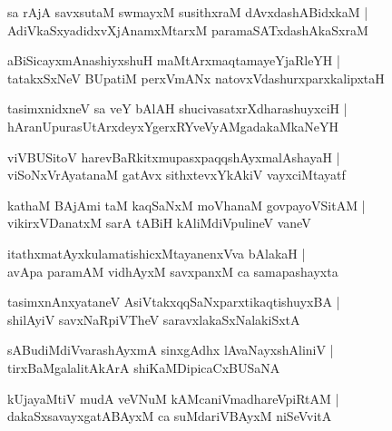 \documentclass[twoside,12pt,openright]{book}
\newcounter{shloka}[chapter]
\begin{document}
\begin{shloka}%
sa rAjA savxsutaM swmayxM susithxraM dAvxdashABidxkaM |\\
AdiVkaSxyadidxvXjAnamxMtarxM paramaSATxdashAkaSxraM 
\end{shloka}

\begin{shloka}%
aBiSicayxmAnashiyxshuH maMtArxmaqtamayeYjaRleYH |\\
tatakxSxNeV BUpatiM perxVmANx natovxVdashurxparxkalipxtaH 
\end{shloka}

\begin{shloka}%
tasimxnidxneV sa veY bAlAH shucivasatxrXdharashuyxciH |\\
hAranUpurasUtArxdeyxYgerxRYveVyAMgadakaMkaNeYH 
\end{shloka}

\begin{shloka}%
viVBUSitoV harevBaRkitxmupasxpaqqshAyxmalAshayaH |\\
viSoNxVrAyatanaM gatAvx sithxtevxYkAkiV vayxciMtayatf
\end{shloka}

\begin{shloka}%
kathaM BAjAmi taM kaqSaNxM moVhanaM govpayoVSitAM |\\
vikirxVDanatxM sarA tABiH kAliMdiVpulineV vaneV 
\end{shloka}

\begin{shloka}%
itathxmatAyxkulamatishicxMtayanenxVva bAlakaH |\\
avApa paramAM vidhAyxM savxpanxM ca samapashayxta
\end{shloka}

\begin{shloka}%
tasimxnAnxyataneV AsiVtakxqqSaNxparxtikaqtishuyxBA |\\
shilAyiV savxNaRpiVTheV saravxlakaSxNalakiSxtA 
\end{shloka}

\begin{shloka}%
sABudiMdiVvarashAyxmA sinxgAdhx lAvaNayxshAliniV |\\
tirxBaMgalalitAkArA shiKaMDipicaCxBUSaNA 
\end{shloka}

\begin{shloka}%
kUjayaMtiV mudA veVNuM kAMcaniVmadhareVpiRtAM |\\
dakaSxsavayxgatABAyxM ca suMdariVBAyxM niSeVvitA 
\end{shloka}
\end{document}
